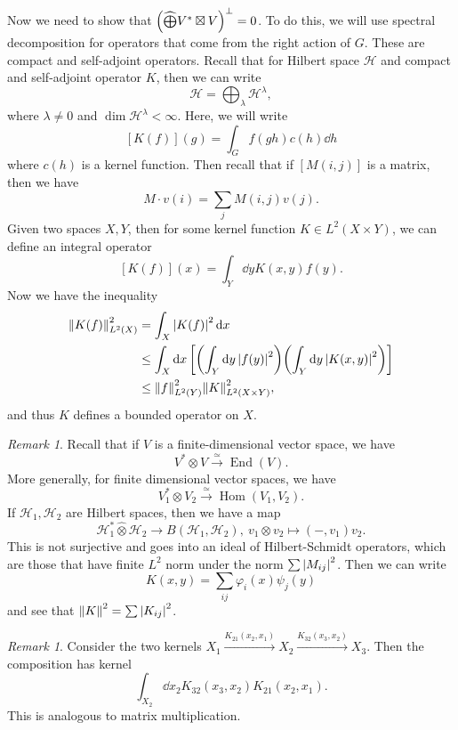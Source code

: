 \documentclass[leqno, openany]{memoir}
\theoremstyle{definition}
\theoremstyle{remark}
\newtheorem{rmk}[thm]{Remark}
\theoremstyle{plain}
\theoremstyle{definition}
\theoremstyle{remark}
\newcommand{\mc}[1]{\mathcal{#1}}
\newcommand{\wh}[1]{\widehat{#1}}
\DeclareMathOperator{\Hom}{Hom}
\DeclareMathOperator{\End}{End}
\begin{document}
Now we need to show that $\qty( \wh{\bigoplus} V^* \boxtimes V )^{\perp} = 0$. To do this, we will use spectral decomposition for operators that come from the right action of $G$. These are compact and self-adjoint operators. Recall that for Hilbert space $\mc{H}$ and compact and self-adjoint operator $K$, then we can write 
\[ \mc{H} = \bigoplus_{\lambda} \mc{H}^{\lambda}, \] 
where $\lambda \neq 0$ and $\dim \mc{H}^{\lambda} < \infty$. Here, we will write
\[ [K(f)](g) = \int_G f(gh) c(h) \dd{h} \]
where $c(h)$ is a kernel function. Then recall that if $[M(i,j)]$ is a matrix, then we have
\[ M \cdot v(i) = \sum_j M(i,j) v(j). \]
Given two spaces $X,Y$, then for some kernel function $K \in L^2(X \times Y)$, we can define an integral operator
\[ [K(f)](x) = \int_Y \dd{y} K(x,y) f(y). \]
Now we have the inequality
\begin{align*}
    \norm{K(f)}^2_{L^2(X)} &= \int_X \abs{K(f)}^2 \dd{x} \\ 
                           &\leq \int_X \dd{x} \qty[ \qty(\int_Y \dd{y} \abs{f(y)}^2) \qty(\int_Y \dd{y} \abs{K(x,y)}^2) ] \\
                           &\leq \norm{f}^2_{L^2(Y)} \norm{K}^2_{L^2(X \times Y)},
\end{align*}
and thus $K$ defines a bounded operator on $X$.

\begin{rmk}
    Recall that if $V$ is a finite-dimensional vector space, we have
    \[ V^* \otimes V \xrightarrow{\simeq} \End(V). \]
    More generally, for finite dimensional vector spaces, we have 
    \[ V_1^* \otimes V_2 \xrightarrow{\simeq} \Hom(V_1, V_2). \]
    If $\mc{H}_1, \mc{H}_2$ are Hilbert spaces, then we have a map
    \[ \mc{H}_1^* \wh{\otimes} \mc{H}_2 \to B(\mc{H}_1, \mc{H}_2),\ v_1 \otimes v_2 \mapsto (-,v_1)v_2. \]
    This is not surjective and goes into an ideal of Hilbert-Schmidt operators, which are those that have finite $L^2$ norm under the norm $\sum \abs{M_{ij}}^2$. Then we can write 
    \[ K(x,y) = \sum_{ij} \varphi_i(x) \psi_j(y) \]
    and see that $\norm{K}^2 = \sum \abs{K_{ij}}^2$.
\end{rmk}

\begin{rmk}
    Consider the two kernels $X_1 \xrightarrow{K_{21}(x_2, x_1)} X_2 \xrightarrow{K_{32}(x_3, x_2)} X_3$. Then the composition has kernel
    \[ \int_{X_2} \dd{x_2} K_{32}(x_3, x_2) K_{21}(x_2, x_1). \]
    This is analogous to matrix multiplication.
\end{rmk}
\end{document}
